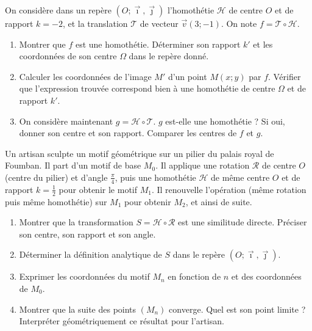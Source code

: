 \documentclass[11pt]{article}
\begin{document}
\begin{exercice}
On considère dans un repère $(O; \vec{\imath}, \vec{\jmath})$ l'homothétie $\mathcal{H}$ de centre $O$ et de rapport $k = -2$, et la translation $\mathcal{T}$ de vecteur $\vec{v}(3; -1)$. On note $f = \mathcal{T} \circ \mathcal{H}$.
\begin{enumerate}
    \item Montrer que $f$ est une homothétie. Déterminer son rapport $k'$ et les coordonnées de son centre $\Omega$ dans le repère donné.
    \item Calculer les coordonnées de l'image $M'$ d'un point $M(x; y)$ par $f$. Vérifier que l'expression trouvée correspond bien à une homothétie de centre $\Omega$ et de rapport $k'$.
    \item On considère maintenant $g = \mathcal{H} \circ \mathcal{T}$. $g$ est-elle une homothétie ? Si oui, donner son centre et son rapport. Comparer les centres de $f$ et $g$.
\end{enumerate}
\end{exercice}

\begin{exercice}
Un artisan sculpte un motif géométrique sur un pilier du palais royal de Foumban. Il part d'un motif de base $M_0$. Il applique une rotation $\mathcal{R}$ de centre $O$ (centre du pilier) et d'angle $\frac{\pi}{4}$, puis une homothétie $\mathcal{H}$ de même centre $O$ et de rapport $k = \frac{1}{2}$ pour obtenir le motif $M_1$. Il renouvelle l'opération (même rotation puis même homothétie) sur $M_1$ pour obtenir $M_2$, et ainsi de suite.
\begin{enumerate}
    \item Montrer que la transformation $S = \mathcal{H} \circ \mathcal{R}$ est une similitude directe. Préciser son centre, son rapport et son angle.
    \item Déterminer la définition analytique de $S$ dans le repère $(O; \vec{\imath}, \vec{\jmath})$.
    \item Exprimer les coordonnées du motif $M_n$ en fonction de $n$ et des coordonnées de $M_0$.
    \item Montrer que la suite des points $(M_n)$ converge. Quel est son point limite ? Interpréter géométriquement ce résultat pour l'artisan.
\end{enumerate}
\end{exercice}
\end{document}
